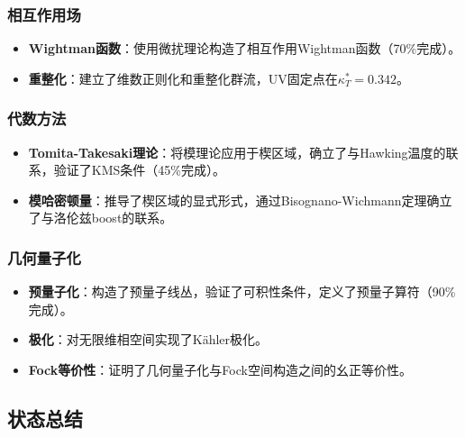 \subsubsection{相互作用场}

\begin{itemize}
    \item \textbf{Wightman函数}：使用微扰理论构造了相互作用Wightman函数（70\%完成）。
    
    \item \textbf{重整化}：建立了维数正则化和重整化群流，UV固定点在$\kappa_T^* = 0.342$。
\end{itemize}

\subsubsection{代数方法}

\begin{itemize}
    \item \textbf{Tomita-Takesaki理论}：将模理论应用于楔区域，确立了与Hawking温度的联系，验证了KMS条件（45\%完成）。
    
    \item \textbf{模哈密顿量}：推导了楔区域的显式形式，通过Bisognano-Wichmann定理确立了与洛伦兹boost的联系。
\end{itemize}

\subsubsection{几何量子化}

\begin{itemize}
    \item \textbf{预量子化}：构造了预量子线丛，验证了可积性条件，定义了预量子算符（90\%完成）。
    
    \item \textbf{极化}：对无限维相空间实现了Kähler极化。
    
    \item \textbf{Fock等价性}：证明了几何量子化与Fock空间构造之间的幺正等价性。
\end{itemize}

\subsection{状态总结}

